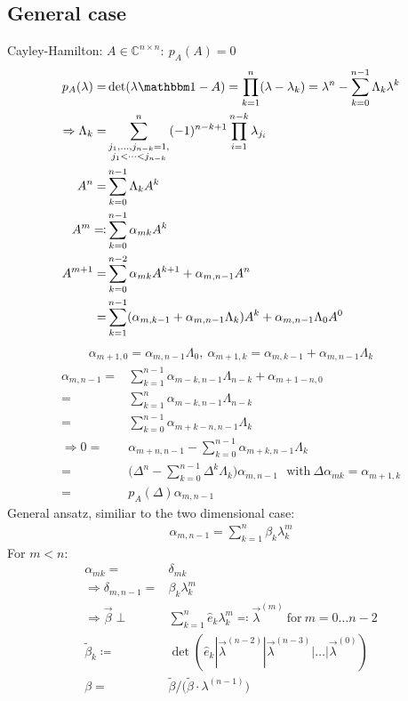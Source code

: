 \documentclass{article}
\begin{document}
\subsection{General case}
Cayley-Hamilton: $A \in \mathbb C^{n\times n}:\ p_A(A) = 0$
\begin{align}
p_A(\lambda) =& \det(\lambda\mathbbm 1 - A) = \prod_{k=1}^n(\lambda - \lambda_k) = \lambda^n - \sum_{k=0}^{n-1} \Lambda_k \lambda^k\nonumber\\
\Rightarrow \Lambda_k =& \sum_{\substack{j_1,\dots,j_{n-k} = 1,\\ j_1<\dots<j_{n-k}}}^n (-1)^{n-k+1} \prod_{i=1}^{n-k} \lambda_{j_i} \\
A^n =& \sum_{k=0}^{n-1} \Lambda_k A^k\nonumber\\
A^m \eqqcolon& \sum_{k=0}^{n-1} \alpha_{mk} A^k\\
A^{m+1} =& \sum_{k=0}^{n-2} \alpha_{mk} A^{k+1} + \alpha_{m,n-1} A^n \nonumber\\
=& \sum_{k=1}^{n-1} (\alpha_{m,k-1} + \alpha_{m,n-1}\Lambda_k) A^k + \alpha_{m,n-1}\Lambda_0 A^0 \nonumber\\
\end{align}
\begin{align}
\alpha_{m+1,0} = \alpha_{m,n-1} \Lambda_0,\ \alpha_{m+1,k} = \alpha_{m,k-1} + \alpha_{m,n-1}\Lambda_k \label{recurrent ndim}
\end{align}
\begin{align}
\alpha_{m,n-1} =& \sum_{k=1}^{n-1} \alpha_{m-k,n-1}\Lambda_{n-k} + \alpha_{m+1-n,0} \nonumber\\
=& \sum_{k=1}^n \alpha_{m-k,n-1}\Lambda_{n-k} \nonumber\\
=& \sum_{k=0}^{n-1} \alpha_{m+k-n,n-1}\Lambda_k\\
\Rightarrow 0=& \alpha_{m+n,n-1} - \sum_{k=0}^{n-1} \alpha_{m+k,n-1}\Lambda_k \nonumber\\
=& \big( \Delta^n - \sum_{k=0}^{n-1} \Delta^k \Lambda_k \big) \alpha_{m, n-1} \ \ \ \text{with}\ \Delta \alpha_{mk} = \alpha_{m+1,k}\nonumber\\
=& p_A(\Delta) \alpha_{m, n-1}
\end{align}
General ansatz, similiar to the two dimensional case:
\begin{align}
\alpha_{m,n-1} = \sum_{k=1}^n \beta_k \lambda_k^m
\end{align}
For $m<n$:
\begin{align}
\alpha_{mk} =& \delta_{mk}\\
\Rightarrow \delta_{m,n-1} =& \beta_k \lambda_k^m\\
\Rightarrow \vec \beta \perp& \sum_{k=1}^n \hat e_k \lambda_k^m \eqqcolon \vec \lambda^{(m)} \ \text{for}\ m=0\dots n-2\\
\tilde\beta_k \coloneqq& \det(\hat e_k | \vec\lambda^{(n-2)} | \vec\lambda^{(n-3)} | \dots | \vec\lambda^{(0)})\nonumber\\
\beta =& \tilde\beta /\big( \tilde \beta \cdot \lambda^{(n-1)} \big)
\end{align}
\end{document}
